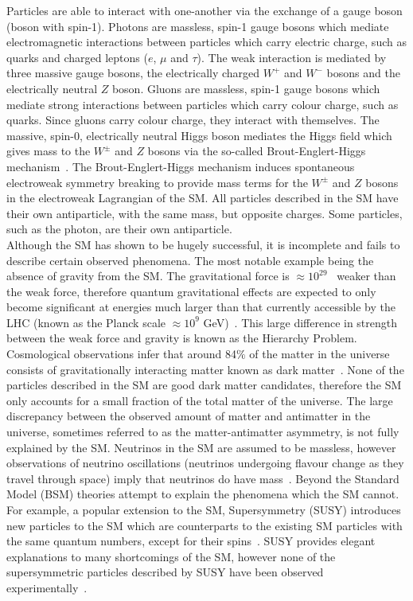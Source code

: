 \noindent
Particles are able to interact with one-another via the exchange of a gauge boson (boson with spin-1). Photons are massless, spin-1 gauge bosons which mediate electromagnetic interactions between particles which carry electric charge, such as quarks and charged leptons ($e$, $\mu$ and $\tau$). The weak interaction is mediated by three massive gauge bosons, the electrically charged $W^{+}$ and $W^{-}$ bosons and the electrically neutral $Z$ boson. Gluons are massless, spin-1 gauge bosons which mediate strong interactions between particles which carry colour charge, such as quarks. Since gluons carry colour charge, they interact with themselves. The massive, spin-0, electrically neutral Higgs boson mediates the Higgs field which gives mass to the $W^{\pm}$ and $Z$ bosons via the so-called Brout-Englert-Higgs mechanism~\cite{PhysRevLett.13.321, Higgs:1966ev, Higgs:1964pj}. The Brout-Englert-Higgs mechanism induces spontaneous electroweak symmetry breaking to provide mass terms for the $W^{\pm}$ and $Z$ bosons in the electroweak Lagrangian of the SM. All particles described in the SM have their own antiparticle, with the same mass, but opposite charges. Some particles, such as the photon, are their own antiparticle.\\

\noindent
Although the SM has shown to be hugely successful, it is incomplete and fails to describe certain observed phenomena. The most notable example being the absence of gravity from the SM. The gravitational force is $\approx 10^{29}$~\cite{thomson2013modern} weaker than the weak force, therefore quantum gravitational effects are expected to only become significant at energies much larger than that currently accessible by the LHC (known as the Planck scale $\approx 10^{9}$ GeV)~\cite{hierarchy-problem-paper}. This large difference in strength between the weak force and gravity is known as the Hierarchy Problem. Cosmological observations infer that around 84$\%$ of the matter in the universe consists of gravitationally interacting matter known as dark matter~\cite{Jarosik_2011}. None of the particles described in the SM are good dark matter candidates, therefore the SM only accounts for a small fraction of the total matter of the universe. The large discrepancy between the observed amount of matter and antimatter in the universe, sometimes referred to as the matter-antimatter asymmetry, is not fully explained by the SM. Neutrinos in the SM are assumed to be massless, however observations of neutrino oscillations (neutrinos undergoing flavour change as they travel through space) imply that neutrinos do have mass~\cite{fantini2020formalism}. Beyond the Standard Model (BSM) theories attempt to explain the phenomena which the SM cannot. For example, a popular extension to the SM, Supersymmetry (SUSY) introduces new particles to the SM which are counterparts to the existing SM particles with the same quantum numbers, except for their spins~\cite{kirsten2010introduction}. SUSY provides elegant explanations to many shortcomings of the SM, however none of the supersymmetric particles described by SUSY have been observed experimentally~\cite{CANEPA2019100033}.

